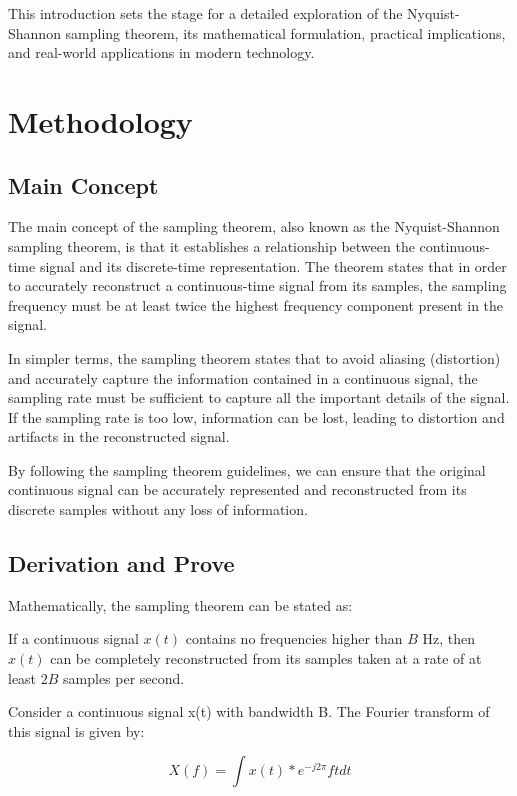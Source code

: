 \documentclass{IEEEtran}
\begin{document}
		This introduction sets the stage for a detailed exploration of the Nyquist-Shannon sampling theorem, its mathematical formulation, practical implications, and real-world applications in modern technology.
	
	\section{Methodology}
	\subsection{Main Concept}
		The main concept of the sampling theorem, also known as the Nyquist-Shannon sampling theorem, is that it establishes a relationship between the continuous-time signal and its discrete-time representation. The theorem states that in order to accurately reconstruct a continuous-time signal from its samples, the sampling frequency must be at least twice the highest frequency component present in the signal. 
		
		In simpler terms, the sampling theorem states that to avoid aliasing (distortion) and accurately capture the information contained in a continuous signal, the sampling rate must be sufficient to capture all the important details of the signal. If the sampling rate is too low, information can be lost, leading to distortion and artifacts in the reconstructed signal. 
		
		By following the sampling theorem guidelines, we can ensure that the original continuous signal can be accurately represented and reconstructed from its discrete samples without any loss of information.
		
	\subsection{Derivation and Prove}
	Mathematically, the sampling theorem can be stated as:
		
	If a continuous signal $ x(t) $ contains no frequencies higher than $ B $ Hz, then $ x(t) $ can be completely reconstructed from its samples taken at a rate of at least $ 2B $ samples per second.
		
	Consider a continuous signal x(t) with bandwidth B. The Fourier transform of this signal is given by:
		
	\begin{equation}
		 X(f) = \int x(t) * {e ^ {-j2 \pi}} ft dt
	\end{equation}
		
\end{document}
